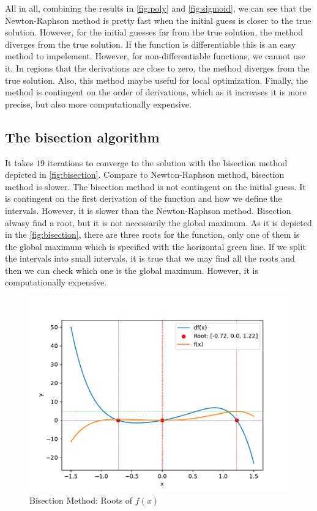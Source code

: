 \documentclass[a4paper,10pt,american]{article}
\begin{document}
All in all, combining the results in \autoref{fig:poly} and \autoref{fig:sigmoid}, we can see that the Newton-Raphson method is pretty fast when the initial guess is closer to the true solution. However, for the initial guesses far from the true solution, the method diverges from the true solution. If the function is differentiable this is an easy method to impelement. However, for non-differentiable functions, we cannot use it. In regions that the derivations are close to zero, the method diverges from the true solution. Also, this method maybe useful for local optimization. Finally, the method is contingent on the order of derivations, which as it increases it is more precise, but also more computationally expensive.

\subsection{The bisection algorithm}

It takes $19$ iterations to converge to the solution with the bisection method depicted in \autoref{fig:bisection}. Compare to Newton-Raphson method, bisection method is slower. The bisection method is not contingent on the initial guess. It is contingent on the first derivation of the function and how we define the intervals. However, it is slower than the Newton-Raphson method. Bisection alwasy find a root, but it is not necessarily the global maximum. As it is depicted in the \autoref{fig:bisection}, there are three roots for the function, only one of them is the global maximum which is specified with the horizontal green line. If we split the intervals into small intervals, it is true that we may find all the roots and then we can check which one is the global maximum. However, it is computationally expensive.

\begin{figure}[H]
\centering
\includegraphics[width=1\linewidth]{../Plots/Bisection.pdf}
\caption{Bisection Method: Roots of $f(x)$}
\label{fig:bisection}
\end{figure}
\end{document}
